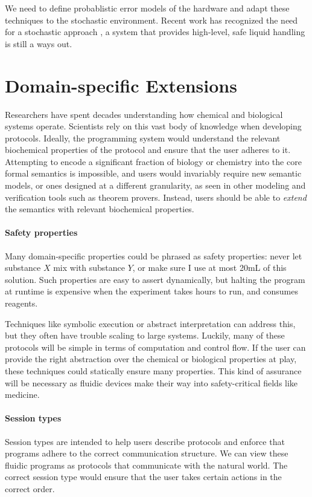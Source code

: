 \documentclass[
  10pt,
  a4paper,
  twocolumn,
]{article}
\begin{document}
We need to define probablistic error models of the hardware and adapt these techniques to the stochastic environment.
Recent work has recognized the need for a stochastic approach \cite{bioprotocols}, a system that provides high-level, safe liquid handling is still a ways out.

\section*{Domain-specific Extensions}

Researchers have spent decades understanding how chemical and biological systems operate.
Scientists rely on this vast body of knowledge when developing protocols.
Ideally, the programming system would understand the relevant biochemical properties of the protocol and
ensure that the user adheres to it. Attempting to encode a significant fraction of biology or chemistry into the core
formal semantics is impossible, and users would invariably require new semantic models, or ones designed at a different granularity,
as seen in other modeling  and verification tools such as theorem provers. Instead, users should be able to \emph{extend}
the semantics with relevant biochemical properties.

\paragraph{Safety properties}

Many domain-specific properties could be phrased as safety properties: never let substance $X$ mix with substance $Y$, or make sure I use at most 20mL of this solution.
Such properties are easy to assert dynamically, but halting the program at runtime is expensive when the
experiment takes hours to run, and consumes reagents.

Techniques like symbolic execution or abstract interpretation can address this, but they often have trouble scaling to
large systems. Luckily, many of these protocols will be simple in terms of computation and control flow.
If the user can provide the right abstraction over the chemical or biological properties at play, these techniques could statically ensure many properties.
This kind of assurance will be necessary as fluidic devices make their way into safety-critical fields like medicine.

\paragraph{Session types}
Session types are intended to help users describe protocols and enforce that programs adhere to the correct
communication structure. We can view these fluidic programs as protocols that communicate with the natural world.
The correct session type would  ensure that the user takes certain actions in the correct order.
\end{document}
